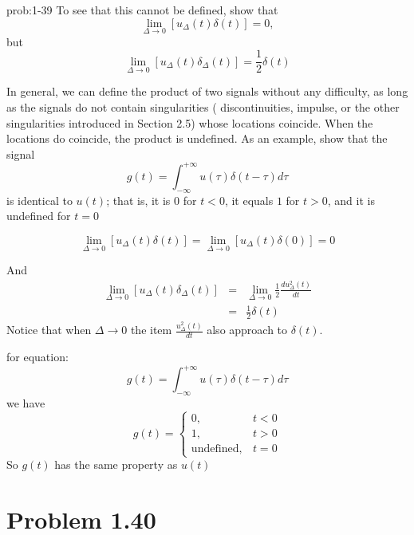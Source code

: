 \documentclass[koma,a4paper,utopia,12pt,listings-color,microtype,paralist,colorlinks,urlcolor=red]{org-article}
\begin{document}
\begin{prob}[]{prob:1-39}
To see that this cannot be defined, show that
\begin{equation*}
\lim_{\Delta\to 0} [u_{\Delta}(t)\delta(t)] = 0,
\end{equation*}
but
\begin{equation*}
\lim_{\Delta\to 0} [u_{\Delta}(t)\delta_{\Delta}(t)] = \frac{1}{2} \delta(t)
\end{equation*}

In general, we can define the product of two signals without any difficulty,
as long as the signals do not contain  singularities  ( discontinuities,
impulse, or the other singularities introduced in Section 2.5) whose
locations coincide. When the locations do coincide, the product is
undefined. As an example, show that the signal
\begin{equation*}
g(t) = \int_{-\infty}^{+\infty} u( \tau )\delta(t-\tau)d\tau
\end{equation*}
is identical to \(u(t)\); that is, it is \(0\) for \(t < 0\), it equals
\(1\) for \(t> 0\), and it is undefined for \(t=0\)
\label{prob:1-39}
\end{prob}

\begin{equation*}
\lim_{\Delta\to 0} [u_{\Delta}(t)\delta(t)] = \lim_{\Delta\to 0} [u_{\Delta}(t)\delta(0)] = 0
\end{equation*}

And
\begin{eqnarray*}
\lim_{\Delta\to 0} [u_{\Delta}(t)\delta_{\Delta}(t)] &=& \lim_{\Delta\to 0 } \frac{1}{2} \frac{d u_{\Delta}^{2}(t)}{dt} \\
&=& \frac{1}{2} \delta(t)
\end{eqnarray*}
Notice that when \(\Delta\to 0\) the item  \(\frac{u_{\Delta}^{2}(t)}{dt}\)
also approach to \(\delta(t)\).

for equation:
\begin{equation*}
g(t) = \int_{-\infty}^{+\infty} u( \tau )\delta(t-\tau)d\tau
\end{equation*}
we have
\begin{equation*}
g(t) =
\begin{cases}
0, & t< 0 \\
1, & t> 0 \\
\mathrm{undefined}, & t = 0
\end{cases}

\end{equation*}
So \(g(t)\) has the same property as \(u(t)\)
\section{Problem 1.40}
\label{sec:org71282a6}
\end{document}
